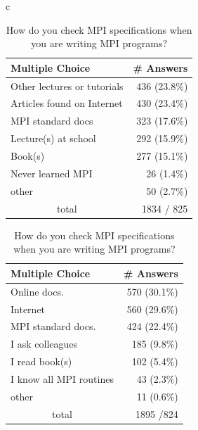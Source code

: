 \documentclass[sigconf,nonacm]{acmart}
\begin{document}
\begin{table}[htb]%
\scriptsize
\begin{center}%
\begin{tabular}[t]{c}

\begin{minipage}[t]{0.24\hsize}
\begin{center}%
\caption{\small How did you learn MPI?}%
\label{tab:Q10-ans}%
\begin{tabular}[t]{l|r}%
\hline%
Multiple Choice & \# Answers \\%
\hline%
Other lectures or tutorials & 436 (23.8\%) \\%
Articles found on Internet & 430 (23.4\%) \\%
MPI standard docs & 323 (17.6\%) \\%
Lecture(s) at school & 292 (15.9\%) \\%
Book(s) & 277 (15.1\%) \\%
Never learned MPI & 26 (1.4\%) \\%
other & 50 (2.7\%) \\%
\hline%
\multicolumn{1}{c}{total} & 1834 / 825 \\%
\hline%
\end{tabular}%
\end{center}%
\end{minipage}

\hspace{1mm}
\begin{minipage}[t]{0.24\hsize}
\begin{center}%
\caption{\footnotesize How do you check MPI specifications when you are writing MPI programs?}%
\label{tab:Q14-ans}%
\begin{tabular}[t]{l|r}%
\hline%
Multiple Choice & \# Answers \\%
\hline%
Online docs. & 570 (30.1\%) \\%
Internet & 560 (29.6\%) \\%
MPI standard docs. & 424 (22.4\%) \\%
I ask colleagues & 185 (9.8\%) \\%
I read book(s) & 102 (5.4\%) \\%
I know all MPI routines & 43 (2.3\%) \\%
other & 11 (0.6\%) \\%
\hline%
\multicolumn{1}{c}{total} & 1895 /824 \\%
\hline%
\end{tabular}%
\end{center}%
\end{minipage}


\end{tabular}
\end{center}
\end{table}
\end{document}
